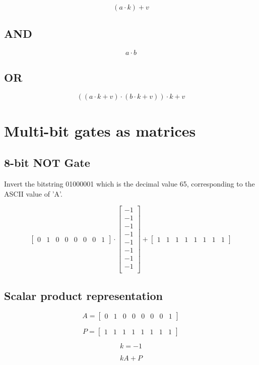 \documentclass[11pt]{article} %
\begin{document}
$$ (a \cdot k) + v$$

\subsection{AND}
$$ a\cdot b$$

\subsection{OR}
$$ (   (a \cdot k + v) \cdot (b \cdot k +v) ) \cdot k  + v$$



\section{Multi-bit gates as matrices}
\subsection{8-bit NOT Gate}
Invert the bitstring 01000001 which is the decimal value 65, corresponding to the ASCII value of 'A'.

\begin{equation}
\nonumber
  \begin{bmatrix}
   0 & 1 & 0 & 0 & 0 & 0 & 0 & 1   
  \end{bmatrix}
\cdot
  \begin{bmatrix}
    -1 \\
    -1 \\
    -1 \\
    -1 \\
    -1 \\
    -1 \\
    -1 \\
    -1 \\
  \end{bmatrix} 
%
+
  \begin{bmatrix}
   1 & 1 & 1 & 1 & 1 & 1 & 1 & 1   
 \end{bmatrix} 
\end{equation}

\subsection{Scalar product representation}

\begin{equation}
A = 
\begin{bmatrix}
0 & 1 & 0 & 0 & 0 & 0 & 0 & 1   
  \end{bmatrix}
\end{equation}


\begin{equation}
P = 
\begin{bmatrix}
   1 & 1 & 1 & 1 & 1 & 1 & 1 & 1   
\end{bmatrix}
\end{equation}

\begin{equation}
k = -1
\end{equation}

\begin{equation}
kA +  P
\end{equation}
\end{document}
